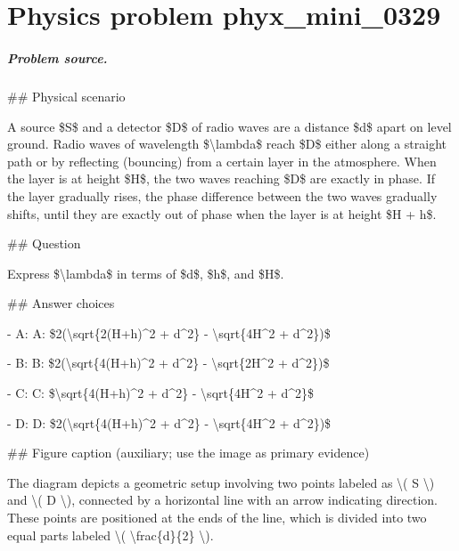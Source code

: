 
\chapter{Physics problem phyx\_mini\_0329}
\label{ch:PhyXMiniProblems_problem_phyx_mini_0329}

\paragraph{Problem source.}
\#\# Physical scenario

A source \$S\$ and a detector \$D\$ of radio waves are a distance \$d\$ apart on level ground. Radio waves of wavelength \$\textbackslash{}lambda\$ reach \$D\$ either along a straight path or by reflecting (bouncing) from a certain layer in the atmosphere. When the layer is at height \$H\$, the two waves reaching \$D\$ are exactly in phase. If the layer gradually rises, the phase difference between the two waves gradually shifts, until they are exactly out of phase when the layer is at height \$H + h\$.

\#\# Question

Express \$\textbackslash{}lambda\$ in terms of \$d\$, \$h\$, and \$H\$.

\#\# Answer choices

- A: A: \$2(\textbackslash{}sqrt\{2(H+h)\textasciicircum{}2 + d\textasciicircum{}2\} - \textbackslash{}sqrt\{4H\textasciicircum{}2 + d\textasciicircum{}2\})\$

- B: B: \$2(\textbackslash{}sqrt\{4(H+h)\textasciicircum{}2 + d\textasciicircum{}2\} - \textbackslash{}sqrt\{2H\textasciicircum{}2 + d\textasciicircum{}2\})\$

- C: C: \$\textbackslash{}sqrt\{4(H+h)\textasciicircum{}2 + d\textasciicircum{}2\} - \textbackslash{}sqrt\{4H\textasciicircum{}2 + d\textasciicircum{}2\}\$

- D: D: \$2(\textbackslash{}sqrt\{4(H+h)\textasciicircum{}2 + d\textasciicircum{}2\} - \textbackslash{}sqrt\{4H\textasciicircum{}2 + d\textasciicircum{}2\})\$

\#\# Figure caption (auxiliary; use the image as primary evidence)

The diagram depicts a geometric setup involving two points labeled as \textbackslash{}( S \textbackslash{}) and \textbackslash{}( D \textbackslash{}), connected by a horizontal line with an arrow indicating direction. These points are positioned at the ends of the line, which is divided into two equal parts labeled \textbackslash{}( \textbackslash{}frac\{d\}\{2\} \textbackslash{}).

